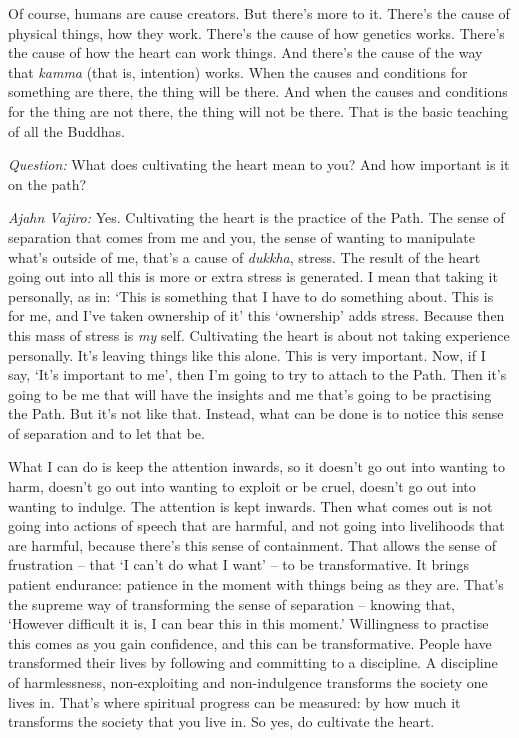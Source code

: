 \enlargethispage{\baselineskip}

Of course, humans are cause creators. But there's more to it. There's the cause
of physical things, how they work. There's the cause of how genetics works.
There's the cause of how the heart can work things. And there's the cause of the
way that \emph{kamma} (that is, intention) works. When the causes and conditions
for something are there, the thing will be there. And when the causes and
conditions for the thing are not there, the thing will not be there. That is the
basic teaching of all the Buddhas.

\bigskip

\emph{Question:} What does cultivating the heart mean to you? And how important is it
on the path?

\emph{Ajahn Vajiro:} Yes. Cultivating the heart is the practice of the Path. The sense
of separation that comes from me and you, the sense of wanting to manipulate
what's outside of me, that's a cause of \emph{dukkha}, stress. The result of the
heart going out into all this is more or extra stress is generated. I mean that
taking it personally, as in: `This is something that I have to do something
about. This is for me, and I've taken ownership of it' this `ownership' adds
stress. Because then this mass of stress is \emph{my} self. Cultivating the
heart is about not taking experience personally. It's leaving things like this
alone. This is very important. Now, if I say, `It's important to me', then I'm
going to try to attach to the Path. Then it's going to be me that will have the
insights and me that's going to be practising the Path. But it's not like that.
Instead, what can be done is to notice this sense of separation and to let that
be.

What I can do is keep the attention inwards, so it doesn't go out into wanting
to harm, doesn't go out into wanting to exploit or be cruel, doesn't go out into
wanting to indulge. The attention is kept inwards. Then what comes out is not
going into actions of speech that are harmful, and not going into livelihoods
that are harmful, because there's this sense of containment. That allows the
sense of frustration -- that `I can't do what I want' -- to be transformative.
It brings patient endurance: patience in the moment with things being as they
are. That's the supreme way of transforming the sense of separation -- knowing
that, `However difficult it is, I can bear this in this moment.' Willingness to
practise this comes as you gain confidence, and this can be transformative.
People have transformed their lives by following and committing to a discipline.
A discipline of harmlessness, non-exploiting and non-indulgence transforms the
society one lives in. That's where spiritual progress can be measured: by how
much it transforms the society that you live in. So yes, do cultivate the heart.

